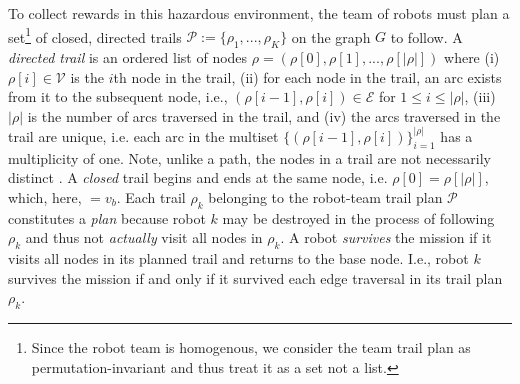 \documentclass[fleqn,10pt,lineno]{wlpeerj}
\begin{document}
To collect rewards in this hazardous environment, the team of robots must plan a set\footnote{Since the robot team is homogenous, we consider the team trail plan as permutation-invariant and thus treat it as a set not a list.} of closed, directed trails $\mathcal{P}:=\{\rho_1, ..., \rho_K\}$ on the graph $G$ to follow.
A \emph{directed trail} \cite{clark1991first,graphtheory2} is an ordered list of nodes $\rho = (\rho[0], \rho[1], ..., \rho[\lvert \rho \rvert])$ where
(i) $\rho[i] \in \mathcal{V}$ is the $i$th node in the trail,  
(ii) for each node in the trail, an arc exists from it to the subsequent node, i.e., $(\rho[i-1], \rho[i])\in\mathcal{E}$ for $1 \leq i  \leq \lvert \rho \rvert$,
(iii) $\lvert \rho \rvert$ is the number of arcs traversed in the trail,
and
(iv) the arcs traversed in the trail are unique, i.e. each arc in the multiset $\{(\rho[i-1], \rho[i])\}_{i=1}^{\lvert \rho \rvert}$ has a multiplicity of one.
Note, unlike a path, the nodes in a trail are not necessarily distinct \cite{wilson1979introduction}.
A \emph{closed} trail begins and ends at the same node, i.e. $\rho [0]=\rho[\lvert \rho \rvert]$, which, here, $=v_b$.
Each trail $\rho_k$ belonging to the robot-team trail plan $\mathcal{P}$ constitutes a \emph{plan} because robot $k$ may be destroyed in the process of following $\rho_k$ and thus not \emph{actually} visit all nodes in $\rho_k$. A robot \emph{survives} the mission if it visits all nodes in its planned trail and returns to the base node. I.e., robot $k$ survives the mission if and only if it survived each edge traversal in its trail plan $\rho_k$.
\end{document}
